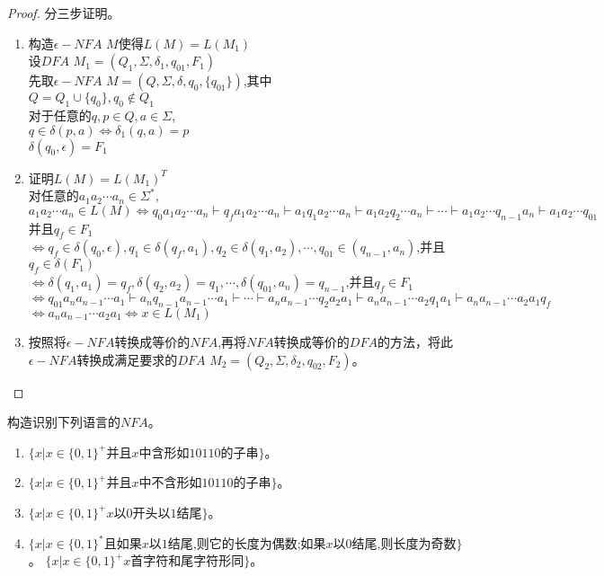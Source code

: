 \begin{solution}
	\begin{proof}
		分三步证明。
		\begin{enumerate} 
			\item 构造$\epsilon-NFA$ $M$使得$L(M)=L(M_1)$\\
			设$DFA$ $M_1=(Q_1,\Sigma,\delta_1,q_{01},F_1)$\\
			先取$\epsilon-NFA$ $M=(Q,\Sigma,\delta,q_0,\{q_{01}\})$,其中\\
			$Q=Q_1\cup\{q_0\},q_0\notin Q_1$\\
			对于任意的$q,p\in Q,a\in\Sigma$,\\
			$q\in\delta(p,a)\Leftrightarrow\delta_1(q,a)=p$\\
			$\delta(q_0,\epsilon)=F_1$
			
			\item 证明$L(M)=L(M_1)^T$\\
			对任意的$a_1a_2\cdots a_n\in\Sigma^\ast$,\\
		    $a_1a_2\cdots a_n\in L(M)\Leftrightarrow q_0a_1a_2\cdots a_n\vdash q_fa_1a_2\cdots a_n\vdash a_1q_1a_2\cdots a_n\vdash a_1a_2q_2\cdots a_n\vdash \cdots \vdash a_1a_2\cdots q_{n-1}a_n\vdash a_1a_2\cdots q_{01}$并且$q_f\in F_1$\\
		    $\Leftrightarrow q_f\in \delta(q_0,\epsilon),q_1\in\delta(q_f,a_1),q_2\in\delta(q_1,a_2),\cdots,q_{01}\in(q_{n-1},a_n)$,并且$q_f\in\delta(F_1)$\\
		    $\Leftrightarrow \delta(q_1,a_1)=q_f,\delta(q_2,a_2)=q_1,\cdots,\delta(q_{01},a_n)=q_{n-1}$,并且$q_f\in F_1$\\
		    $\Leftrightarrow q_{01}a_na_{n-1}\cdots a_1\vdash a_nq_{n-1}a_{n-1}\cdots a_1\vdash\cdots\vdash a_na_{n-1}\cdots q_2a_2a_1\vdash a_na_{n-1}\cdots a_2q_1a_1\vdash a_na_{n-1}\cdots a_2a_1q_f$\\
		    $\Leftrightarrow a_na_{n-1}\cdots a_2a_1\Leftrightarrow x\in L(M_1)$
		    
		    \item 按照将$\epsilon-NFA$转换成等价的$NFA$,再将$NFA$转换成等价的$DFA$的方法，将此$\epsilon-NFA$转换成满足要求的$DFA$ $M_2=(Q_2,\Sigma,\delta_2,q_{02},F_2)$。
		\end{enumerate}
	\end{proof}
\end{solution}

\begin{exercise}
	构造识别下列语言的$NFA$。
	\begin{enumerate}
		\item $\{x|x\in\{0,1\}^+\text{并且$x$中含形如$10110$的子串}\}$。
		\item $\{x|x\in\{0,1\}^+\text{并且$x$中不含形如$10110$的子串}\}$。
		\item $\{x|x\in\{0,1\}^+\text{$x$以0开头以1结尾}\}$。
		\item $\{x|x\in\{0,1\}^\ast\text{且如果$x$以1结尾,则它的长度为偶数;如果$x$以0结尾,则长度为奇数}\}$。
		$\{x|x\in\{0,1\}^+\text{$x$首字符和尾字符形同}\}$。
	\end{enumerate}
\end{exercise}

